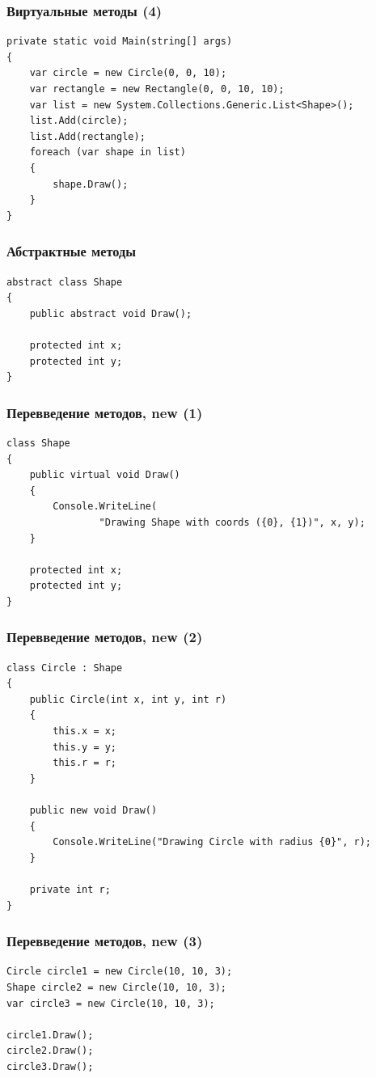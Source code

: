 \documentclass[xetex,mathserif,serif]{beamer}
\begin{document}
	\begin{frame}[fragile]
		\frametitle{Виртуальные методы (4)}
		\begin{verbatim}
private static void Main(string[] args)
{
    var circle = new Circle(0, 0, 10);
    var rectangle = new Rectangle(0, 0, 10, 10);
    var list = new System.Collections.Generic.List<Shape>();
    list.Add(circle);
    list.Add(rectangle);
    foreach (var shape in list)
    {
        shape.Draw();
    }
}
		\end{verbatim}
	\end{frame}

	\begin{frame}[fragile]
		\frametitle{Абстрактные методы}
		\begin{verbatim}
abstract class Shape
{
    public abstract void Draw();

    protected int x;
    protected int y;
}
		\end{verbatim}
\end{frame}

	\begin{frame}[fragile]
		\frametitle{Перевведение методов, new (1)}
		\begin{verbatim}
class Shape
{
    public virtual void Draw()
    {
        Console.WriteLine(
                "Drawing Shape with coords ({0}, {1})", x, y);
    }

    protected int x;
    protected int y;
}
		\end{verbatim}
	\end{frame}

	\begin{frame}[fragile]
		\frametitle{Перевведение методов, new (2)}
		\begin{small}
			\begin{verbatim}
class Circle : Shape
{
    public Circle(int x, int y, int r)
    {
        this.x = x;
        this.y = y;
        this.r = r;
    }

    public new void Draw()
    {
        Console.WriteLine("Drawing Circle with radius {0}", r);
    }

    private int r;
}
			\end{verbatim}
		\end{small}
	\end{frame}

	\begin{frame}[fragile]
		\frametitle{Перевведение методов, new (3)}
		\begin{verbatim}
Circle circle1 = new Circle(10, 10, 3);
Shape circle2 = new Circle(10, 10, 3);
var circle3 = new Circle(10, 10, 3);

circle1.Draw();
circle2.Draw();
circle3.Draw();
		\end{verbatim}
	\end{frame}
\end{document}
